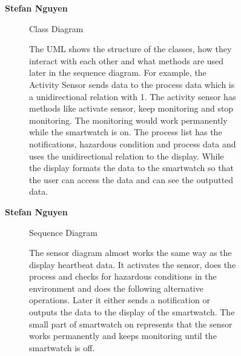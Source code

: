\documentclass{article}
\begin{document}
	\clearpage
	\begin{figure}[htbp]
		\textbf{Stefan Nguyen}
		\centering
		\begin{subfigure}{\textwidth}
			\resizebox{\textwidth}{!}{}
			\caption{Class Diagram}
		\end{subfigure}
		\begin{subfigure}{\textwidth}
			The UML shows the structure of the classes, how they interact with each other and what methods are 
			used later in the sequence diagram. For example, the Activity Sensor sends data to the process data 
			which is a unidirectional relation with 1. The activity sensor has methods like activate sensor, keep 
			monitoring and stop monitoring. The monitoring would work permanently while the smartwatch is on. The 
			process list has the notifications, hazardous condition and process data and uses the unidirectional 
			relation to the display. While the display formats the data to the smartwatch so that the user can access 
			the data and can see the outputted data. 
		\end{subfigure}
	\end{figure}
	\clearpage

	\begin{figure}[htbp]
		\textbf{Stefan Nguyen}
		\centering
		\begin{subfigure}{\textwidth}
			\resizebox{\textwidth}{!}{}
			\caption{Sequence Diagram}
		\end{subfigure}
		\begin{subfigure}{\textwidth}
			The sensor diagram almost works the same way as the display heartbeat data. It activates the sensor, 
			does the process and checks for hazardous conditions in the environment and does the following alternative
			operations. Later it either sends a notification or outputs the data to the display of the smartwatch. 
			The small part of smartwatch on represents that the sensor works permanently and keeps monitoring until 
			the smartwatch is off. 
		\end{subfigure}
	\end{figure}
	\clearpage
\end{document}
